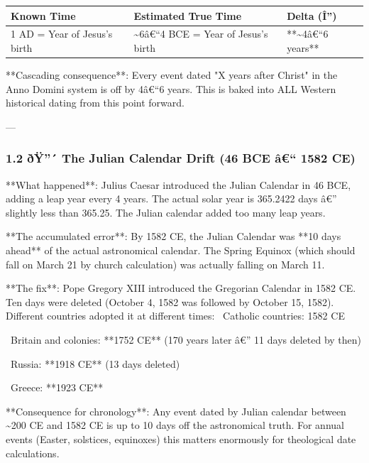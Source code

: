\documentclass[aps,prd,11pt,onecolumn,superscriptaddress,nofootinbib,floatfix]{revtex4-2}
\begin{document}
\begin{table}[h!]
\centering
\begin{tabular}{p{3cm}p{3cm}p{3cm}}
\hline
Known Time & Estimated True Time & Delta (Î'') \\
\hline
1 AD = Year of Jesus's birth & \textasciitilde{}6â€``4 BCE = Year of Jesus's birth & **\textasciitilde{}4â€``6 years** \\
\hline
\end{tabular}
\end{table}



**Cascading consequence**: Every event dated "X years after Christ" in the Anno Domini system is off by 4â€``6 years. This is baked into ALL Western historical dating from this point forward.


---


\subsubsection{1.2 ðŸ''´ The Julian Calendar Drift (46 BCE â€`` 1582 CE)}


**What happened**: Julius Caesar introduced the Julian Calendar in 46 BCE, adding a leap year every 4 years. The actual solar year is 365.2422 days â€'' slightly less than 365.25. The Julian calendar added too many leap years.


**The accumulated error**: By 1582 CE, the Julian Calendar was **10 days ahead** of the actual astronomical calendar. The Spring Equinox (which should fall on March 21 by church calculation) was actually falling on March 11.


**The fix**: Pope Gregory XIII introduced the Gregorian Calendar in 1582 CE. Ten days were deleted (October 4, 1582 was followed by October 15, 1582). Different countries adopted it at different times:
\textbullet~Catholic countries: 1582 CE

\textbullet~Britain and colonies: **1752 CE** (170 years later â€'' 11 days deleted by then)

\textbullet~Russia: **1918 CE** (13 days deleted)

\textbullet~Greece: **1923 CE**



**Consequence for chronology**: Any event dated by Julian calendar between \textasciitilde{}200 CE and 1582 CE is up to 10 days off the astronomical truth. For annual events (Easter, solstices, equinoxes) this matters enormously for theological date calculations.
\end{document}
